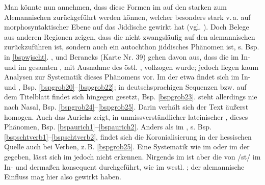 Man könnte nun annehmen, dass diese Formen im  auf den starken  zum Alemannischen zurückgeführt werden können, welcher besonders stark v.\,a. auf morphosyntaktischer Ebene auf das Jiddische gewirkt hat (vgl. \cite{Schaefer2014}). Doch Belege aus anderen Regionen zeigen, dass die  nicht zwangsläufig auf den alemannischen  zurückzuführen ist, sondern auch ein autochthon jiddisches Phänomen ist, s. Bsp. in \ref{bspwjscht}. \textcite[98f]{GuggenheimGruenberg1958}, \textcite[20]{Beem1970} und Beraneks  (Karte Nr. 39) gehen davon aus, dass die  im In- und  im gesamten , mit Ausnahme des östl. , vollzogen wurde; jedoch liegen kaum Analysen zur Systematik dieses Phänomens vor. Im  der  etwa findet sich  im In- und , Bsp. \ref{bspgrob20}–\ref{bspgrob22}; in deutschsprachigen Sequenzen bzw. auf dem Titelblatt findet sich hingegen  gesetzt, Bsp. \ref{bspgrob23}.  steht allerdings nie nach Nasal, Bsp. \ref{bspgrob24}–\ref{bspgrob25}. Darin verhält sich der Text äußerst homogen. Auch das  Aurichs zeigt, in unmissverständlicher lateinischer , dieses Phänomen, Bsp. \ref{bspaurich1}–\ref{bspaurich2}. Anders als im , s. Bsp. \ref{bspschtverb1}–\ref{bspschtverb2}, findet sich die Koronialisierung in der hessischen Quelle auch bei Verben, z.\,B. \ref{bspgrob25}.  Eine  Systematik wie im  oder im  der  gegeben, lässt sich im  jedoch nicht erkennen. Nirgends im  ist aber die  von /st/ im In- und  dermaßen konsequent durchgeführt, wie im westl. ; der alemannische Einfluss mag hier also gewirkt haben.\\

